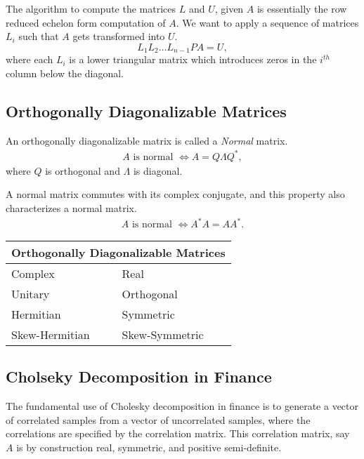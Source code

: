 \documentclass{amsart}
\theoremstyle{plain}
\numberwithin{equation}{section}
\begin{document}
The algorithm to compute the matrices $L$ and $U$, given $A$ is 
essentially the row reduced echelon form computation of $A$. 
We want to apply a sequence of matrices $L_i$ such that 
$A$ gets transformed into $U$. 
\begin{equation}
L_1 L_2 \ldots L_{n-1} PA = U,
\label{}
\end{equation}
where each $L_i$ is a lower triangular matrix
which introduces zeros in the $i^{th}$ column
below the diagonal. 

\subsection{Orthogonally Diagonalizable Matrices}
An orthogonally diagonalizable matrix is called
a \emph{Normal} matrix. 
\begin{align*}
A \text{ is normal } \Leftrightarrow A = Q\Lambda Q^*,
\end{align*}
where $Q$ is orthogonal and $\Lambda$ is diagonal.

A normal matrix commutes with its complex conjugate, and 
this property also characterizes a normal matrix.
\begin{align*}
A \text{ is normal } \Leftrightarrow A^*A = AA^*.
\end{align*}

\begin{center}
\begin{tabular}{ |p{3cm}|p{3cm}| }
 \hline
 \multicolumn{2}{|c|}{ Orthogonally Diagonalizable Matrices }\\
 \hline
 Complex & Real \\
 \hline
 Unitary  & Orthogonal\\
 Hermitian & Symmetric\\
 Skew-Hermitian & Skew-Symmetric \\
 \hline
\end{tabular}
\end{center}

\subsection{Cholseky Decomposition in Finance}
The fundamental use of Cholesky decomposition 
in finance is to generate a vector of correlated
samples from a vector of uncorrelated samples, where
the correlations are specified by the correlation 
matrix. This correlation matrix, say $A$ is by 
construction real, symmetric, and positive semi-definite.
\end{document}
